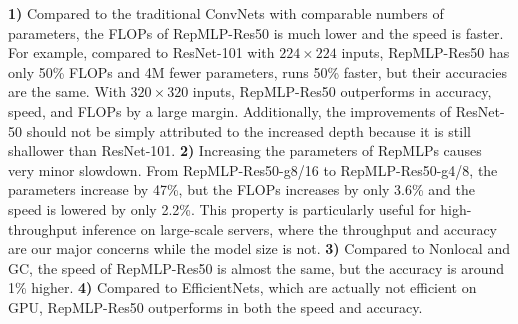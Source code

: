 \documentclass[10pt,twocolumn,letterpaper]{article}
\begin{document}
\textbf{1)} Compared to the traditional ConvNets with comparable numbers of parameters, the FLOPs of RepMLP-Res50 is much lower and the speed is faster. For example, compared to ResNet-101 with $224\times224$ inputs, RepMLP-Res50 has only 50\% FLOPs and 4M fewer parameters, runs 50\% faster, but their accuracies are the same. With $320\times320$ inputs, RepMLP-Res50 outperforms in accuracy, speed, and FLOPs by a large margin. Additionally, the improvements of ResNet-50 should not be simply attributed to the increased depth because it is still shallower than ResNet-101. \textbf{2)} Increasing the parameters of RepMLPs causes very minor slowdown. From RepMLP-Res50-g8/16 to RepMLP-Res50-g4/8, the parameters increase by 47\%, but the FLOPs increases by only 3.6\% and the speed is lowered by only 2.2\%. This property is particularly useful for high-throughput inference on large-scale servers, where the throughput and accuracy are our major concerns while the model size is not. \textbf{3)} Compared to Nonlocal and GC, the speed of RepMLP-Res50 is almost the same, but the accuracy is around 1\% higher. \textbf{4)} Compared to EfficientNets, which are actually not efficient on GPU, RepMLP-Res50 outperforms in both the speed and accuracy.
\end{document}
